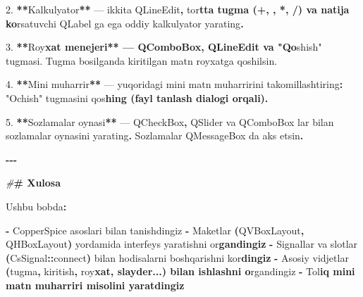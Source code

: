 \documentclass[a4paper,11pt,twoside,openright]{book}
\newenvironment{Shaded}{\begin{snugshade}}{\end{snugshade}}
\newcommand{\CharTok}[1]{\textcolor[rgb]{0.31,0.60,0.02}{#1}}
\newcommand{\ErrorTok}[1]{\textcolor[rgb]{0.64,0.00,0.00}{\textbf{#1}}}
\newcommand{\FloatTok}[1]{\textcolor[rgb]{0.00,0.00,0.81}{#1}}
\newcommand{\NormalTok}[1]{#1}
\newcommand{\OperatorTok}[1]{\textcolor[rgb]{0.81,0.36,0.00}{\textbf{#1}}}
\newcommand{\PreprocessorTok}[1]{\textcolor[rgb]{0.56,0.35,0.01}{\textit{#1}}}
\newcommand{\StringTok}[1]{\textcolor[rgb]{0.31,0.60,0.02}{#1}}
\begin{document}
\begin{Shaded}
\begin{Highlighting}[]
\FloatTok{2.} \OperatorTok{**}\NormalTok{Kalkulyator}\OperatorTok{**}\NormalTok{ — ikkita }\ErrorTok{\textasciigrave{}}\NormalTok{QLineEdit}\ErrorTok{\textasciigrave{}}\OperatorTok{,}\NormalTok{ to}\CharTok{\textquotesingle{}r}\ErrorTok{tta tugma (\textasciigrave{}+\textasciigrave{}, \textasciigrave{}{-}\textasciigrave{}, \textasciigrave{}*\textasciigrave{}, \textasciigrave{}/\textasciigrave{}) va natija ko}\CharTok{\textquotesingle{}}\NormalTok{rsatuvchi }\ErrorTok{\textasciigrave{}}\NormalTok{QLabel}\ErrorTok{\textasciigrave{}}\NormalTok{ ga ega oddiy kalkulyator yarating}\OperatorTok{.}

\FloatTok{3.} \OperatorTok{**}\NormalTok{Ro}\CharTok{\textquotesingle{}y}\ErrorTok{xat menejeri** — \textasciigrave{}QComboBox\textasciigrave{}, \textasciigrave{}QLineEdit\textasciigrave{} va "Qo}\CharTok{\textquotesingle{}}\NormalTok{shish}\StringTok{" tugmasi. Tugma bosilganda kiritilgan matn ro\textquotesingle{}yxatga qo\textquotesingle{}shilsin.}

\FloatTok{4.} \OperatorTok{**}\NormalTok{Mini muharrir}\OperatorTok{**}\NormalTok{ — yuqoridagi mini matn muharririni takomillashtiring}\OperatorTok{:} \StringTok{"Ochish"}\NormalTok{ tugmasini qo}\CharTok{\textquotesingle{}s}\ErrorTok{hing (fayl tanlash dialogi orqali).}

\FloatTok{5.} \OperatorTok{**}\NormalTok{Sozlamalar oynasi}\OperatorTok{**}\NormalTok{ — }\ErrorTok{\textasciigrave{}}\NormalTok{QCheckBox}\ErrorTok{\textasciigrave{}}\OperatorTok{,} \ErrorTok{\textasciigrave{}}\NormalTok{QSlider}\ErrorTok{\textasciigrave{}}\NormalTok{ va }\ErrorTok{\textasciigrave{}}\NormalTok{QComboBox}\ErrorTok{\textasciigrave{}}\NormalTok{ lar bilan sozlamalar oynasini yarating}\OperatorTok{.}\NormalTok{ Sozlamalar }\ErrorTok{\textasciigrave{}}\NormalTok{QMessageBox}\ErrorTok{\textasciigrave{}}\NormalTok{ da aks etsin}\OperatorTok{.}

\OperatorTok{{-}{-}{-}}

\PreprocessorTok{\#}\ErrorTok{\# Xulosa}

\NormalTok{Ushbu bobda}\OperatorTok{:}

\OperatorTok{{-}}\NormalTok{ CopperSpice asoslari bilan tanishdingiz}
\OperatorTok{{-}}\NormalTok{ Maketlar }\OperatorTok{(}\ErrorTok{\textasciigrave{}}\NormalTok{QVBoxLayout}\ErrorTok{\textasciigrave{}}\OperatorTok{,} \ErrorTok{\textasciigrave{}}\NormalTok{QHBoxLayout}\ErrorTok{\textasciigrave{}}\OperatorTok{)}\NormalTok{ yordamida interfeys yaratishni o}\CharTok{\textquotesingle{}r}\ErrorTok{gandingiz}
\OperatorTok{{-}}\NormalTok{ Signallar va slotlar }\OperatorTok{(}\ErrorTok{\textasciigrave{}}\NormalTok{CsSignal}\OperatorTok{::}\NormalTok{connect}\ErrorTok{\textasciigrave{}}\OperatorTok{)}\NormalTok{ bilan hodisalarni boshqarishni ko}\CharTok{\textquotesingle{}r}\ErrorTok{dingiz}
\OperatorTok{{-}}\NormalTok{ Asosiy vidjetlar }\OperatorTok{(}\NormalTok{tugma}\OperatorTok{,}\NormalTok{ kiritish}\OperatorTok{,}\NormalTok{ ro}\CharTok{\textquotesingle{}y}\ErrorTok{xat, slayder...) bilan ishlashni o}\CharTok{\textquotesingle{}}\NormalTok{rgandingiz}
\OperatorTok{{-}}\NormalTok{ To}\CharTok{\textquotesingle{}l}\ErrorTok{iq mini matn muharriri misolini yaratdingiz}


\end{Highlighting}
\end{Shaded}
\end{document}
